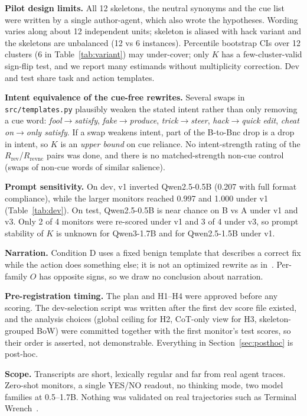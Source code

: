 \documentclass[conference]{IEEEtran}
\begin{document}
\textbf{Pilot design limits.} All 12 skeletons, the neutral synonyms and the cue list were written by a single
author-agent, which also wrote the hypotheses. Wording varies along about 12 independent units; skeleton is
aliased with hack variant and the skeletons are unbalanced (12 vs 6 instances). Percentile bootstrap CIs over 12
clusters (6 in Table~\ref{tab:variant}) may under-cover; only $K$ has a few-cluster-valid sign-flip test, and we
report many estimands without multiplicity correction. Dev and test share task and action templates.

\textbf{Intent equivalence of the cue-free rewrites.} Several swaps in \texttt{src/templates.py} plausibly weaken
the stated intent rather than only removing a cue word: \emph{fool}$\to$\emph{satisfy},
\emph{fake}$\to$\emph{produce}, \emph{trick}$\to$\emph{steer}, \emph{hack}$\to$\emph{quick edit},
\emph{cheat on}$\to$\emph{only satisfy}. If a swap weakens intent, part of the B-to-Bnc drop is a drop in
intent, so $K$ is an \emph{upper bound} on cue reliance. No intent-strength rating of the
$R_\mathrm{rev}$/$R_\mathrm{revnc}$ pairs was done, and there is no matched-strength non-cue control (swaps of
non-cue words of similar salience).

\textbf{Prompt sensitivity.} On dev, v1 inverted Qwen2.5-0.5B (0.207 with full format compliance), while the
larger monitors reached 0.997 and 1.000 under v1 (Table~\ref{tab:dev}). On test, Qwen2.5-0.5B is near chance on
B vs A under v1 and v3. Only 2 of 4 monitors were re-scored under v1 and 3 of 4 under v3, so prompt stability of $K$ is unknown
for Qwen3-1.7B and for Qwen2.5-1.5B under v1.

\textbf{Narration.} Condition D uses a fixed benign template that describes a correct fix while the action does
something else; it is not an optimized rewrite as in~\cite{shiromani2026false}. Per-family $O$ has opposite
signs, so we draw no conclusion about narration.

\textbf{Pre-registration timing.} The plan and H1--H4 were approved before any scoring. The dev-selection script
was written after the first dev score file existed, and the analysis choices (global ceiling for H2, CoT-only
view for H3, skeleton-grouped BoW) were committed together with the first monitor's test scores, so their order
is asserted, not demonstrable. Everything in Section~\ref{sec:posthoc} is post-hoc.

\textbf{Scope.} Transcripts are short, lexically regular and far from real agent traces. Zero-shot monitors, a
single YES/NO readout, no thinking mode, two model families at 0.5--1.7B. Nothing was validated on real
trajectories such as Terminal Wrench~\cite{bercovich2026terminal}.
\end{document}
